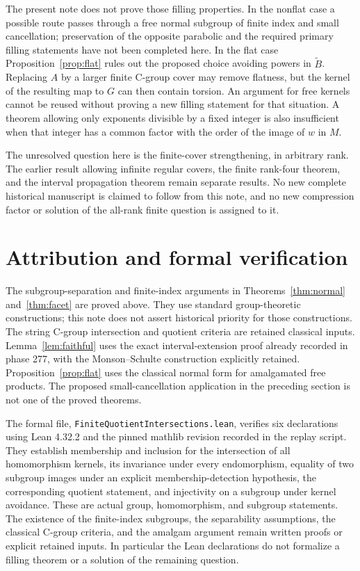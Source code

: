 \documentclass[11pt]{article}
\theoremstyle{remark}\newtheorem{remark}[theorem]{Remark}
\begin{document}
The present note does not prove those filling properties. In the
nonflat case a possible route passes through a free normal subgroup of
finite index and small cancellation; preservation of the opposite
parabolic and the required primary filling statements have not been
completed here. In the flat case Proposition~\ref{prop:flat} rules out
the proposed choice avoiding powers in \(\widetilde B\). Replacing
\(A\) by a larger finite C-group cover may remove flatness, but the
kernel of the resulting map to \(G\) can then contain torsion. An
argument for free kernels cannot be reused without proving a new
filling statement for that situation. A theorem allowing only
exponents divisible by a fixed integer is also insufficient when that
integer has a common factor with the order of the image of \(w\) in \(M\).

The unresolved question here is the finite-cover strengthening, in
arbitrary rank. The earlier result allowing infinite regular covers,
the finite rank-four theorem, and the interval propagation theorem
remain separate results. No new complete historical manuscript is
claimed to follow from this note, and no new compression factor or
solution of the all-rank finite question is assigned to it.

\section{Attribution and formal verification}

The subgroup-separation and finite-index arguments in
Theorems~\ref{thm:normal} and~\ref{thm:facet} are proved above. They use
standard group-theoretic constructions; this note does not assert
historical priority for those constructions. The string C-group
intersection and quotient criteria are retained classical inputs.
Lemma~\ref{lem:faithful} uses the exact interval-extension proof already
recorded in phase 277, with the Monson--Schulte construction explicitly
retained. Proposition~\ref{prop:flat} uses the classical normal form for
amalgamated free products. The proposed small-cancellation application
in the preceding section is not one of the proved theorems.

The formal file, \texttt{FiniteQuotientIntersections.lean}, verifies six
declarations using Lean 4.32.2 and the pinned mathlib revision recorded
in the replay script. They establish membership and inclusion for the
intersection of all homomorphism kernels, its invariance under every
endomorphism, equality of two subgroup images under an explicit
membership-detection hypothesis, the corresponding quotient statement,
and injectivity on a subgroup under kernel avoidance. These are actual
group, homomorphism, and subgroup statements. The existence of the
finite-index subgroups, the separability assumptions, the classical
C-group criteria, and the amalgam argument remain written proofs or
explicit retained inputs. In particular the Lean declarations do not
formalize a filling theorem or a solution of the remaining question.
\end{document}
